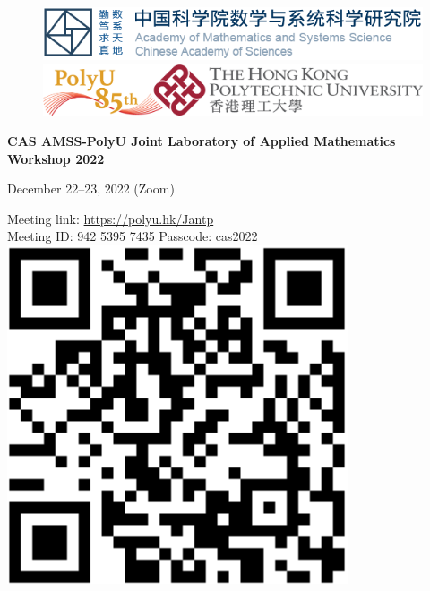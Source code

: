 \documentclass[
	openany, %
	parskip=full, %
	12pt, %
	a4paper, %
]{conferencebooklet} %
\begin{document}
\vspace*{3cm}
\begin{center}

%
%


\thispagestyle{empty}


\begin{figure}
\begin{multicols}{2}
\centering
\includegraphics[width=.96\linewidth]{amss_cn.png}\\
\includegraphics[width=.96\linewidth]{polyu85.png}\\
\end{multicols}
\end{figure}

\LARGE\textbf{CAS AMSS-PolyU Joint Laboratory of Applied Mathematics Workshop 2022}




\vspace*{2cm}
\Large

December 22--23, 2022 (Zoom)

Meeting link: \url{https://polyu.hk/Jantp}\\
\vspace{0.5cm}
Meeting ID: 942 5395 7435 \quad Passcode: cas2022\\
\vspace{1cm}
\includegraphics[scale=0.5]{qrcode.png}

\end{center}
\end{document}
